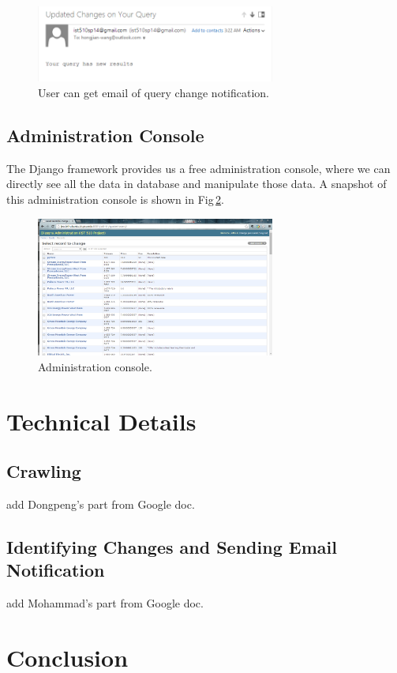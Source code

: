 \documentclass{article}
\begin{document}
\begin{figure}[h]
\centering
\includegraphics[width=0.7\textwidth]{fig/email-notification.PNG}
\caption{User can get email of query change notification.}
\label{fig:email}
\end{figure}


\subsection{Administration Console}

The Django framework provides us a free administration console, where we can directly see all the data in database and manipulate those data. A snapshot of this administration console is shown in Fig\,\ref{fig:admin}.

\begin{figure}[h]
\centering
\includegraphics[width=0.7\textwidth]{fig/adminpage.png}
\caption{Administration console.}
\label{fig:admin}
\end{figure}




\section{Technical Details}

\subsection{Crawling}

add Dongpeng's part from Google doc.

\subsection{Identifying Changes and Sending Email Notification}

add Mohammad's part from Google doc.


\section{Conclusion}
\end{document}

